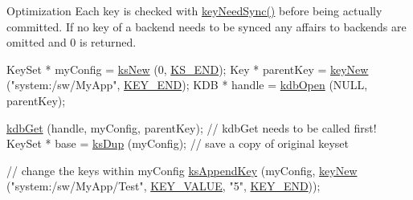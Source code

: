 \begin{DoxyParagraph}{Optimization}
Each key is checked with \hyperlink{group__keytest_gaf247df0de7aca04b32ef80e39ef12950}{key\+Need\+Sync()} before being actually committed. If no key of a backend needs to be synced any affairs to backends are omitted and 0 is returned.
\end{DoxyParagraph}

\begin{DoxyCodeInclude}
KeySet * myConfig = \hyperlink{group__keyset_ga671e1aaee3ae9dc13b4834a4ddbd2c3c}{ksNew} (0, \hyperlink{group__keyset_ga7a28fce3773b2c873c94ac80b8b4cd54}{KS\_END});
Key * parentKey = \hyperlink{group__key_gad23c65b44bf48d773759e1f9a4d43b89}{keyNew} (\textcolor{stringliteral}{"system:/sw/MyApp"}, \hyperlink{group__key_gga9b703ca49f48b482def322b77d3e6bc8aa8adb6fcb92dec58fb19410eacfdd403}{KEY\_END});
KDB * handle = \hyperlink{group__kdb_ga844e1299a84c3fbf1d3a905c5c893ba5}{kdbOpen} (NULL, parentKey);

\hyperlink{group__kdb_ga28e385fd9cb7ccfe0b2f1ed2f62453a1}{kdbGet} (handle, myConfig, parentKey); \textcolor{comment}{// kdbGet needs to be called first!}
KeySet * base = \hyperlink{group__keyset_gac59e4b328245463f1451f68d5106151c}{ksDup} (myConfig);     \textcolor{comment}{// save a copy of original keyset}

\textcolor{comment}{// change the keys within myConfig}
\hyperlink{group__keyset_gaa5a1d467a4d71041edce68ea7748ce45}{ksAppendKey} (myConfig, \hyperlink{group__key_gad23c65b44bf48d773759e1f9a4d43b89}{keyNew} (\textcolor{stringliteral}{"system:/sw/MyApp/Test"}, 
      \hyperlink{group__key_gga9b703ca49f48b482def322b77d3e6bc8ac66e4a49d09212b79f5754ca6db5bd2e}{KEY\_VALUE}, \textcolor{stringliteral}{"5"}, \hyperlink{group__key_gga9b703ca49f48b482def322b77d3e6bc8aa8adb6fcb92dec58fb19410eacfdd403}{KEY\_END}));


\end{DoxyCodeInclude}

